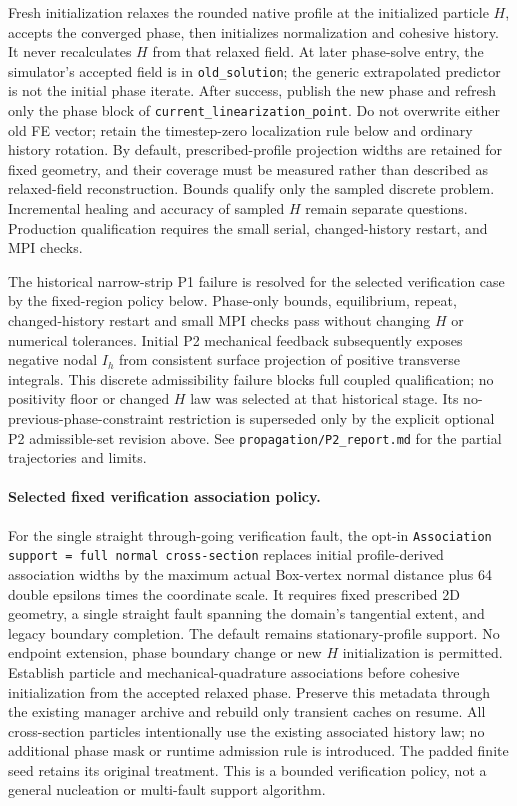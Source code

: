 \documentclass[11pt]{article}
\begin{document}
Fresh initialization relaxes the rounded native profile at the initialized
particle $H$, accepts the converged phase, then initializes normalization and
cohesive history. It never recalculates $H$ from that relaxed field. At later
phase-solve entry, the simulator's accepted field is in \texttt{old\_solution};
the generic extrapolated predictor is not the initial phase iterate. After
success, publish the new phase and refresh only the phase block of
\texttt{current\_linearization\_point}. Do not overwrite either old FE vector;
retain the timestep-zero localization rule below and ordinary history rotation.
By default, prescribed-profile projection widths are retained for fixed geometry,
and their coverage must be measured rather than described as relaxed-field reconstruction.
Bounds qualify only the sampled discrete problem. Incremental healing and
accuracy of sampled $H$ remain separate questions. Production qualification
requires the small serial, changed-history restart, and MPI checks.

The historical narrow-strip P1 failure is resolved for the selected verification
case by the fixed-region policy below. Phase-only bounds, equilibrium, repeat,
changed-history restart and small MPI checks pass without changing $H$ or
numerical tolerances. Initial P2 mechanical feedback subsequently exposes
negative nodal $I_h$ from consistent surface projection of positive transverse
integrals. This discrete admissibility failure blocks full coupled qualification;
no positivity floor or changed $H$ law was selected at that historical stage.
Its no-previous-phase-constraint restriction is superseded only by the explicit
optional P2 admissible-set revision above.
See \texttt{propagation/P2\_report.md} for the partial trajectories and limits.

\paragraph{Selected fixed verification association policy.}
For the single straight through-going verification fault, the opt-in
\texttt{Association support = full normal cross-section} replaces initial
profile-derived association widths by the maximum actual Box-vertex normal
distance plus 64 double epsilons times the coordinate scale. It requires fixed
prescribed 2D geometry, a single straight fault spanning the domain's tangential
extent, and legacy boundary completion. The default remains stationary-profile
support. No endpoint extension, phase boundary change or new $H$ initialization
is permitted. Establish particle and mechanical-quadrature associations before
cohesive initialization from the accepted relaxed phase. Preserve this metadata
through the existing manager archive and rebuild only transient caches on resume.
All cross-section particles intentionally use the existing associated history
law; no additional phase mask or runtime admission rule is introduced. The
padded finite seed retains its original treatment. This is a bounded verification
policy, not a general nucleation or multi-fault support algorithm.
\end{document}
